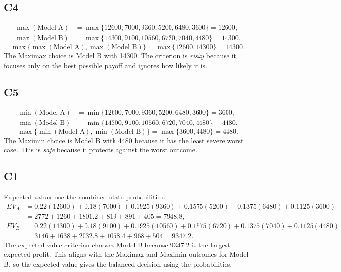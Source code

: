 \begin{ExamProblems}
		\subsection*{C4}
		\[
		\begin{aligned}
		\max(\text{Model A}) &= \max\{12600,7000,9360,5200,6480,3600\} = 12600,\\
		\max(\text{Model B}) &= \max\{14300,9100,10560,6720,7040,4480\} = 14300.
		\end{aligned}
		\]
		\[
		\max\{\max(\text{Model A}), \max(\text{Model B})\}
		= \max\{12600, 14300\}
		= 14300.
		\]
		The Maximax choice is Model B with 14300. The criterion is \emph{risky} because it focuses only on the best possible payoff and ignores how likely it is.

		\subsection*{C5}
		\[
		\begin{aligned}
		\min(\text{Model A}) &= \min\{12600,7000,9360,5200,6480,3600\} = 3600,\\
		\min(\text{Model B}) &= \min\{14300,9100,10560,6720,7040,4480\} = 4480.
		\end{aligned}
		\]
		\[
		\max\{\min(\text{Model A}), \min(\text{Model B})\}
		= \max\{3600, 4480\}
		= 4480.
		\]
		The Maximin choice is Model B with 4480 because it has the least severe worst case. This is \emph{safe} because it protects against the worst outcome.

		\subsection*{C1}
		Expected values use the combined state probabilities.
		\[
		\begin{aligned}
		EV_A &= 0.22(12600)+0.18(7000)+0.1925(9360)+0.1575(5200)+0.1375(6480)+0.1125(3600)\\
		&= 2772+1260+1801.2+819+891+405=7948.8,\\
		EV_B &= 0.22(14300)+0.18(9100)+0.1925(10560)+0.1575(6720)+0.1375(7040)+0.1125(4480)\\
		&= 3146+1638+2032.8+1058.4+968+504=9347.2.
		\end{aligned}
		\]
		The expected value criterion chooses Model B because $9347.2$ is the largest expected profit. This aligns with the Maximax and Maximin outcomes for Model B, so the expected value gives the balanced decision using the probabilities.

		\item

\end{ExamProblems}
